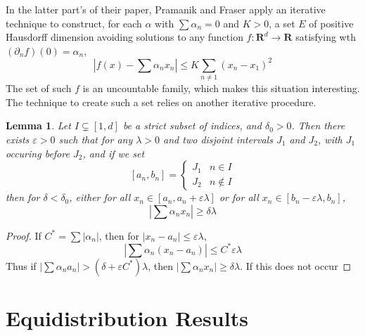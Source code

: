 \documentclass{report}
\theoremstyle{plain}
\newtheorem{lemma}{Lemma}
\theoremstyle{plain}
\begin{document}
In the latter part's of their paper, Pramanik and Fraser apply an iterative technique to construct, for each $\alpha$ with $\sum \alpha_n = 0$ and $K > 0$, a set $E$ of positive Hausdorff dimension avoiding solutions to any function $f: \mathbf{R}^d \to \mathbf{R}$ satisfying wth $(\partial_n f)(0) = \alpha_n$,
%
\[ \left| f(x) - \sum \alpha_n x_n \right| \leq K \sum_{n \neq 1} (x_n - x_1)^2 \]
%
The set of such $f$ is an uncountable family, which makes this situation interesting. The technique to create such a set relies on another iterative procedure.

\begin{lemma}
    Let $I \subsetneq [1,d]$ be a strict subset of indices, and $\delta_0 > 0$. Then there exists $\varepsilon > 0$ such that for any $\lambda > 0$ and two disjoint intervals $J_1$ and $J_2$, with $J_1$ occuring before $J_2$, and if we set
    \[ [a_n,b_n] = \begin{cases} J_1 & n \in I \\ J_2 & n \not \in I \end{cases} \]
    then for $\delta < \delta_0$, either for all $x_n \in [a_n,a_n+\varepsilon \lambda]$ or for all $x_n \in [b_n - \varepsilon \lambda, b_n]$,
    \[ \left| \sum \alpha_n x_n \right| \geq \delta \lambda \]
\end{lemma}
\begin{proof}
    If $C^* = \sum |\alpha_n|$, then for $|x_n - a_n| \leq \varepsilon \lambda$,
    \[ |\sum \alpha_n (x_n - a_n)| \leq C^* \varepsilon \lambda \]
    Thus if $|\sum \alpha_n a_n| > (\delta + \varepsilon C^*)\lambda$, then $|\sum \alpha_n x_n| \geq \delta \lambda$. If this does not occur
\end{proof}









\section{Equidistribution Results}
\end{document}

